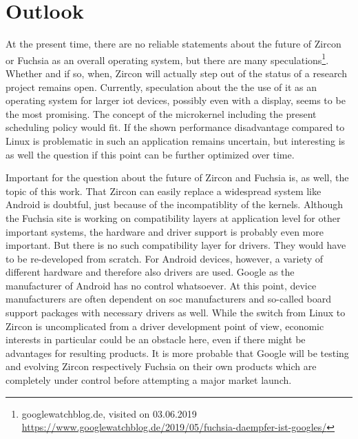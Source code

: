 
\chapter{Outlook}\label{ch:outlook}

%


At the present time, there are no reliable statements about the future of Zircon or Fuchsia as an overall operating system, but there are many speculations\footnote{googlewatchblog.de, visited on 03.06.2019 \url{https://www.googlewatchblog.de/2019/05/fuchsia-daempfer-ist-googles/}}.
Whether and if so, when, Zircon will actually step out of the status of a research project remains open.
Currently, speculation about the the use of it as an operating system for larger \ac{iot} devices, possibly even with a display, seems to be the most promising.
The concept of the microkernel including the present scheduling policy would fit.
If the shown performance disadvantage compared to Linux is problematic in such an application remains uncertain, but interesting is as well the question if this point can be further optimized over time.

Important for the question about the future of Zircon and Fuchsia is, as well, the topic of this work.
That Zircon can easily replace a widespread system like Android is doubtful, just because of the incompatiblity of the kernels.
Although the Fuchsia site is working on compatibility layers at application level for other important systems, the hardware and driver support is probably even more important.
But there is no such compatibility layer for drivers.
They would have to be re-developed from scratch.
For Android devices, however, a variety of different hardware and therefore also drivers are used.
Google as the manufacturer of Android has no control whatsoever.
At this point, device manufacturers are often dependent on \ac{soc} manufacturers and so-called board support packages with necessary drivers as well.
While the switch from Linux to Zircon is uncomplicated from a driver development point of view, economic interests in particular could be an obstacle here, even if there might be advantages for resulting products.
It is more probable that Google will be testing and evolving Zircon respectively Fuchsia on their own products which are completely under control before attempting a major market launch.

